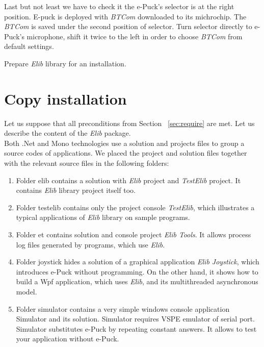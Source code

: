   Last but not least we have to check it the e-Puck's selector is at the right position.
  E-puck is deployed with {\it BTCom} downloaded to its michrochip. 
  The {\it BTCom} is saved under the second position of selector. 
  Turn selector directly to e-Puck's microphone, shift it twice to the left 
  in order to choose {\it BTCom} from default settings.

  Prepare {\it Elib} library for an installation.
  
  \section{Copy installation} \label{sec:copy}
  Let us suppose that all preconditions from Section ~\ref{sec:require} are met.
  Let us describe the content of the {\it Elib} package.\\

  Both .Net and Mono technologies use a solution and projects files to group 
  a source codes of applications. We placed the project and solution files 
  together with the relevant source files in the following folders:

  \begin{enumerate}
          \item Folder { \sf elib} contains a solution with {\it Elib} project 
              and {\it TestElib} project. It contains {\it Elib} library project itself too.
          \item Folder { \sf testelib} contains only the project console {\it TestElib}, 
              which illustrates a typical applications of {\it Elib} library on sample programs.
          \item Folder { \sf et} contains solution and console project {\it Elib Tools}. 
            It allows process log files generated by programs,
            which use {\it Elib}.
          \item Folder { \sf joystick} hides a solution of a graphical application 
            {\it Elib Joystick}, which introduces e-Puck without programming. 
            On the other hand, it shows how to build a Wpf application, 
            which uses {\it Elib}, and its multithreaded asynchronous model.
          \item Folder { \sf simulator}  contains a very simple windows console 
            application Simulator and its solution. 
            Simulator requires VSPE emulator of serial port. 
            Simulator substitutes e-Puck by repeating constant answers. 
            It allows to test your application without e-Puck.
  \end{enumerate}

